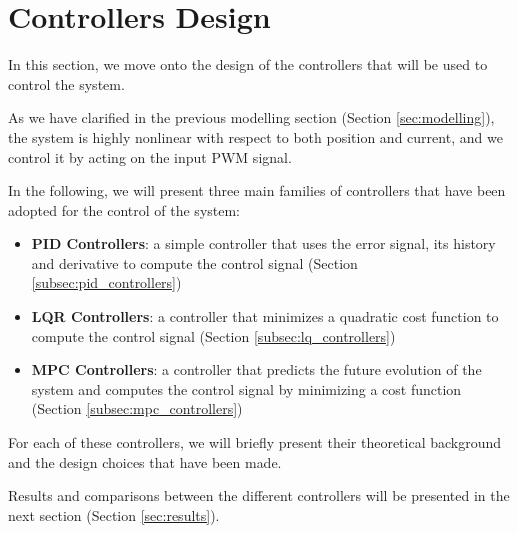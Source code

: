 \section{Controllers Design}
\label{sec:controllers_design}

In this section, we move onto the design of the controllers that will be used to control the system.

As we have clarified in the previous modelling section (Section \ref{sec:modelling}), the system is highly nonlinear with respect to both position and current, and we control it by acting on the input PWM signal.

In the following, we will present three main families of controllers that have been adopted for the control of the system:

\begin{itemize}
    \item \textbf{PID Controllers}: a simple controller that uses the error signal, its history and derivative to compute the control signal (Section \ref{subsec:pid_controllers})
    \item \textbf{LQR Controllers}: a controller that minimizes a quadratic cost function to compute the control signal (Section \ref{subsec:lq_controllers})
    \item \textbf{MPC Controllers}: a controller that predicts the future evolution of the system and computes the control signal by minimizing a cost function (Section \ref{subsec:mpc_controllers})
\end{itemize}

For each of these controllers, we will briefly present their theoretical background and the design choices that have been made.

Results and comparisons between the different controllers will be presented in the next section (Section \ref{sec:results}).



